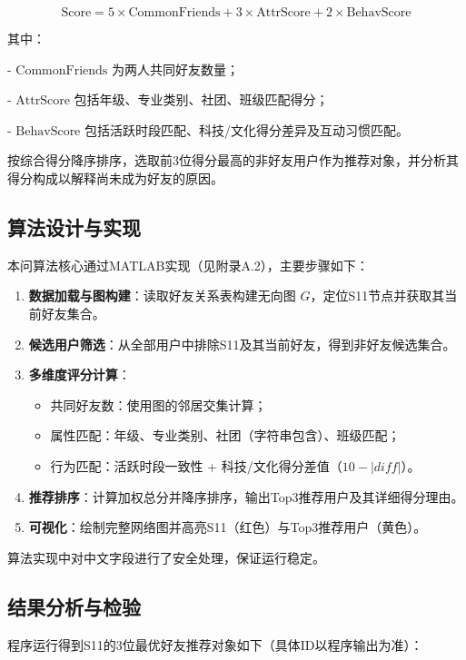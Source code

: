 \documentclass[a4paper,12pt]{ctexart}
\begin{document}
\[
\text{Score} = 5 \times \text{CommonFriends} + 3 \times \text{AttrScore} + 2 \times \text{BehavScore}
\]

其中：

- $\text{CommonFriends}$ 为两人共同好友数量；

- $\text{AttrScore}$ 包括年级、专业类别、社团、班级匹配得分；

- $\text{BehavScore}$ 包括活跃时段匹配、科技/文化得分差异及互动习惯匹配。

按综合得分降序排序，选取前3位得分最高的非好友用户作为推荐对象，并分析其得分构成以解释尚未成为好友的原因。
\subsection{算法设计与实现}
本问算法核心通过MATLAB实现（见附录A.2），主要步骤如下：

\begin{enumerate}
    \item \textbf{数据加载与图构建}：读取好友关系表构建无向图 $G$，定位S11节点并获取其当前好友集合。
    
    \item \textbf{候选用户筛选}：从全部用户中排除S11及其当前好友，得到非好友候选集合。
    
    \item \textbf{多维度评分计算}：
    \begin{itemize}
        \item 共同好友数：使用图的邻居交集计算；
        \item 属性匹配：年级、专业类别、社团（字符串包含）、班级匹配；
        \item 行为匹配：活跃时段一致性 + 科技/文化得分差值（$10 - |diff|$）。
    \end{itemize}
    
    \item \textbf{推荐排序}：计算加权总分并降序排序，输出Top3推荐用户及其详细得分理由。
    
    \item \textbf{可视化}：绘制完整网络图并高亮S11（红色）与Top3推荐用户（黄色）。
\end{enumerate}

算法实现中对中文字段进行了安全处理，保证运行稳定。

\subsection{结果分析与检验}
程序运行得到S11的3位最优好友推荐对象如下（具体ID以程序输出为准）：
\end{document}
